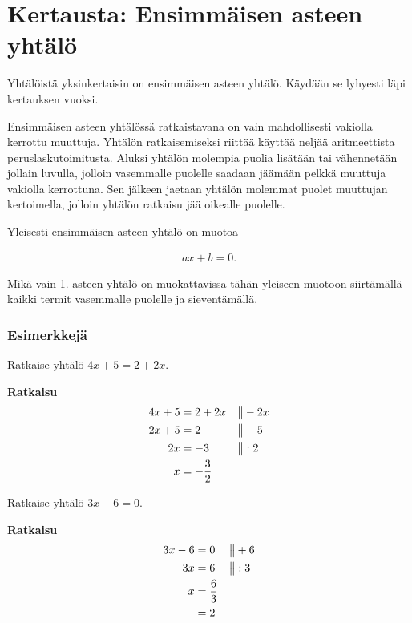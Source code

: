 \section{Kertausta: Ensimmäisen asteen yhtälö}

Yhtälöistä yksinkertaisin on ensimmäisen asteen yhtälö. Käydään se lyhyesti
läpi kertauksen vuoksi.

Ensimmäisen asteen yhtälössä ratkaistavana on vain mahdollisesti vakiolla
kerrottu muuttuja. Yhtälön ratkaisemiseksi riittää käyttää neljää
aritmeettista peruslaskutoimitusta. Aluksi yhtälön molempia puolia
lisätään tai vähennetään jollain luvulla, jolloin
vasemmalle puolelle saadaan jäämään pelkkä muuttuja
vakiolla kerrottuna.
Sen jälkeen jaetaan yhtälön molemmat puolet muuttujan kertoimella, jolloin
yhtälön ratkaisu jää oikealle puolelle.


Yleisesti ensimmäisen asteen yhtälö on muotoa

\begin{align*}
    ax + b = 0.
\end{align*}

Mikä vain 1. asteen yhtälö on muokattavissa tähän yleiseen
muotoon siirtämällä kaikki termit vasemmalle puolelle ja
sieventämällä.

\subsubsection*{Esimerkkejä}

\begin{esimerkki}
Ratkaise yhtälö $4x + 5 = 2 + 2x$.

\textbf{Ratkaisu}
\begin{align*}
    4x + 5 &= 2 + 2x & \big\| & -2x \\
    2x + 5 &= 2      & \big\| & -5 \\
        2x &= -3     & \big\| & :2 \\
         x &= -\frac{3}{2}
 \end{align*}
\end{esimerkki}

\begin{esimerkki}
Ratkaise yhtälö $3x - 6 = 0$.

\textbf{Ratkaisu}
  \begin{align*}
    3x - 6 &= 0 & \big\| & +6 \\
        3x &= 6 & \big\| & :3 \\
         x &= \frac{6}{3} \\
           &= 2
  \end{align*}
\end{esimerkki}


